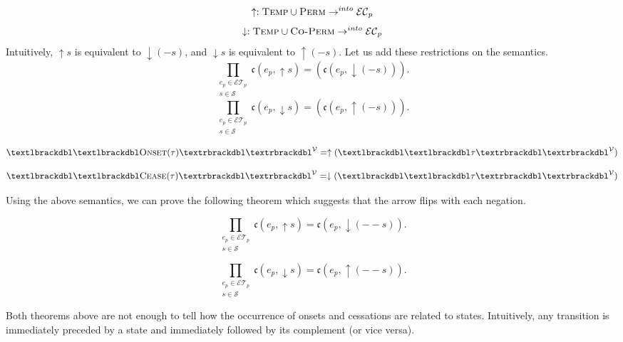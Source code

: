 $$\uparrow :  \textsc{Temp} \cup \textsc{Perm} \to^{into} \mathcal{EC}_p$$
$$\downarrow :  \textsc{Temp} \cup \textsc{Co-Perm} \to^{into} \mathcal{EC}_p$$
Intuitively, $\uparrow s$ is equivalent to $\downarrow(-s)$, and $\downarrow s$ is equivalent to $\uparrow(-s)$. Let us add these restrictions on the semantics.
\begin{equation}
	\prod_{\substack{e_p \in \mathcal{ET}_p \\ s \in \mathcal{S}}} \mathfrak{c}(e_p, \uparrow s) = (\mathfrak{c}(e_p, \downarrow(- s))).
\end{equation}
\begin{equation}\label{ax:cessation}
	\prod_{\substack{e_p \in \mathcal{ET}_p \\ s \in \mathcal{S}}}\mathfrak{c}(e_p, \downarrow s) = (\mathfrak{c}(e_p, \uparrow(- s))).
\end{equation}

\[
	\textlbrackdbl\textlbrackdbl \textsc{Onset}(\tau) \textrbrackdbl \textrbrackdbl^{\mathcal{V}}
	= \uparrow(\textlbrackdbl \textlbrackdbl\tau \textrbrackdbl\textrbrackdbl^{\mathcal{V}})
\]

\[
	\textlbrackdbl\textlbrackdbl \textsc{Cease}(\tau) \textrbrackdbl\textrbrackdbl^{\mathcal{V}}
	= \downarrow(\textlbrackdbl \textlbrackdbl\tau \textrbrackdbl\textrbrackdbl^{\mathcal{V}})
\]


Using the above semantics, we can prove the following theorem which suggests that the arrow flips with each negation.

\begin{theorem}\label{thm:arrow_flip}
	\begin{equation}
		\prod_{\substack{e_p \in \mathcal{ET}_p \\ s \in \mathcal{S}}} \mathfrak{c}(e_p, \uparrow s) = \mathfrak{c}(e_p, \downarrow (-- s)).
	\end{equation}
\end{theorem}
\begin{theorem}
	\begin{equation}
		\prod_{\substack{e_p \in \mathcal{ET}_p \\ s \in \mathcal{S}}}\mathfrak{c}(e_p, \downarrow s) = \mathfrak{c}(e_p, \uparrow (-- s)).
	\end{equation}
\end{theorem}

Both theorems above are not enough to tell how the occurrence of onsets and cessations are related to states.
Intuitively, any
transition is immediately preceded by a state and immediately followed by its complement (or vice versa).

